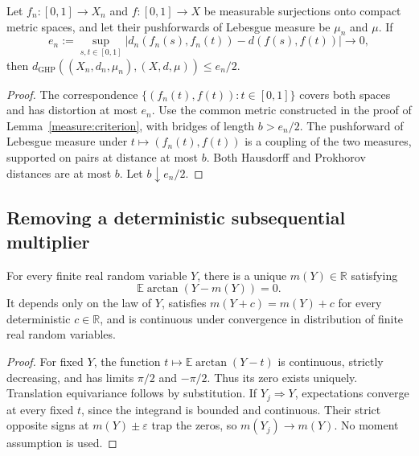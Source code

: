 \begin{lemma}\label{measure:parameter}
Let $f_n:[0,1]\to X_n$ and $f:[0,1]\to X$ be measurable surjections
onto compact metric spaces, and let their pushforwards of Lebesgue
measure be $\mu_n$ and $\mu$. If
\[
 e_n:=\sup_{s,t\in[0,1]}
 |d_n(f_n(s),f_n(t))-d(f(s),f(t))|\longrightarrow0,
\]
then $d_{\mathrm{GHP}}((X_n,d_n,\mu_n),(X,d,\mu))\leq e_n/2$.
\end{lemma}
\begin{proof}
The correspondence $\{(f_n(t),f(t)):t\in[0,1]\}$ covers both spaces
and has distortion at most $e_n$. Use the common metric constructed in
the proof of Lemma~\ref{measure:criterion}, with bridges of length $b>e_n/2$.
The pushforward of Lebesgue measure under $t\mapsto(f_n(t),f(t))$
is a coupling of the two measures, supported on pairs at distance at
most $b$. Both Hausdorff and Prokhorov distances are at most $b$.
Let $b\downarrow e_n/2$.
\end{proof}

\subsection{Removing a deterministic subsequential multiplier}

\begin{lemma}
\label{measure:center}
\label{tree:lem:diameter_center}
For every finite real random variable $Y$, there is a unique $m(Y)\in\mathbb R$
satisfying
\begin{equation}\label{tree:eq:sphere_arctan_center}
                    \mathbb E\arctan(Y-m(Y))=0.
\end{equation}
It depends only on the law of $Y$, satisfies $m(Y+c)=m(Y)+c$ for every
deterministic $c\in\mathbb R$, and is continuous under convergence in
distribution of finite real random variables.
\end{lemma}
\begin{proof}
For fixed $Y$, the function $t\mapsto\mathbb E\arctan(Y-t)$ is
continuous, strictly decreasing, and has limits $\pi/2$ and $-\pi/2$.
Thus its zero exists uniquely. Translation equivariance follows by
substitution. If $Y_j\Rightarrow Y$, expectations converge at every fixed
$t$, since the integrand is bounded and continuous. Their strict opposite
signs at $m(Y)\pm\varepsilon$ trap the zeros, so $m(Y_j)\to m(Y)$.
No moment assumption is used.
\end{proof}

